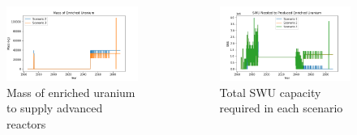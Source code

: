 \begin{frame}
\begin{columns}
      \column[t]{5cm}
  \begin{figure}[t]
      \includegraphics[scale=0.25,trim=0 5 0 10,clip]{figures/enrichedU_advancedrx.png}
      \caption{Mass of enriched uranium to supply advanced reactors}
      \label{fig:enrichedU}
  \end{figure}
  \begin{figure}[h]
      \includegraphics[scale=0.25,trim=0 5 0 10,clip]{figures/swu_all.png}
      \caption{Total SWU capacity required in each scenario}
      \label{fig:swu}
  \end{figure}
  \end{columns}
\end{frame}


